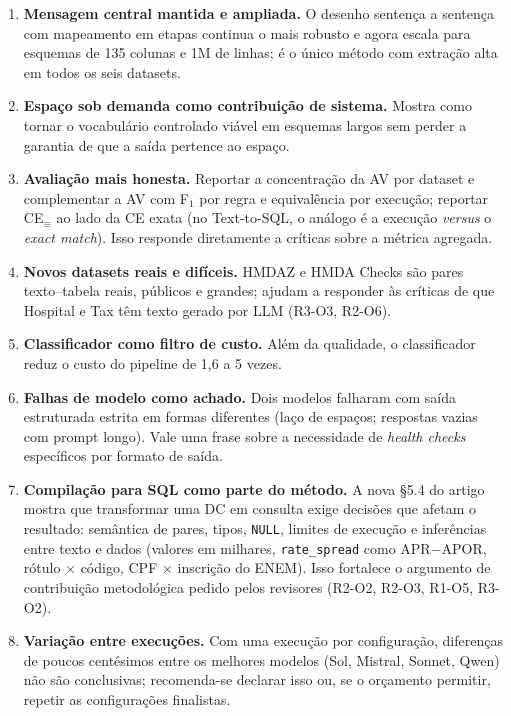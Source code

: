 \documentclass[11pt,a4paper]{article}
\begin{document}
\begin{enumerate}
  \item \textbf{Mensagem central mantida e ampliada.} O desenho sentença a sentença com mapeamento em etapas
        continua o mais robusto e agora escala para esquemas de 135 colunas e 1M de linhas; é o único método
        com extração alta em todos os seis datasets.
  \item \textbf{Espaço sob demanda como contribuição de sistema.} Mostra como tornar o vocabulário controlado
        viável em esquemas largos sem perder a garantia de que a saída pertence ao espaço.
  \item \textbf{Avaliação mais honesta.} Reportar a concentração da AV por dataset e complementar a AV com F$_1$
        por regra e equivalência por execução; reportar CE$_\equiv$ ao lado da CE exata (no Text-to-SQL, o
        análogo é a execução \emph{versus} o \emph{exact match}). Isso responde diretamente a críticas sobre a
        métrica agregada.
  \item \textbf{Novos datasets reais e difíceis.} HMDAZ e HMDA Checks são pares texto--tabela reais, públicos e
        grandes; ajudam a responder às críticas de que Hospital e Tax têm texto gerado por LLM (R3-O3, R2-O6).
  \item \textbf{Classificador como filtro de custo.} Além da qualidade, o classificador reduz o custo do
        pipeline de 1,6 a 5 vezes.
  \item \textbf{Falhas de modelo como achado.} Dois modelos falharam com saída estruturada estrita em formas
        diferentes (laço de espaços; respostas vazias com prompt longo). Vale uma frase sobre a necessidade de
        \emph{health checks} específicos por formato de saída.
  \item \textbf{Compilação para SQL como parte do método.} A nova §5.4 do artigo mostra que transformar uma DC em
        consulta exige decisões que afetam o resultado: semântica de pares, tipos, \texttt{NULL}, limites de
        execução e inferências entre texto e dados (valores em milhares, \texttt{rate\_spread} como APR$-$APOR,
        rótulo $\times$ código, CPF $\times$ inscrição do ENEM). Isso fortalece o argumento de contribuição metodológica
        pedido pelos revisores (R2-O2, R2-O3, R1-O5, R3-O2).
  \item \textbf{Variação entre execuções.} Com uma execução por configuração, diferenças de poucos centésimos
        entre os melhores modelos (Sol, Mistral, Sonnet, Qwen) não são conclusivas; recomenda-se declarar isso ou,
        se o orçamento permitir, repetir as configurações finalistas.
\end{enumerate}
\end{document}
